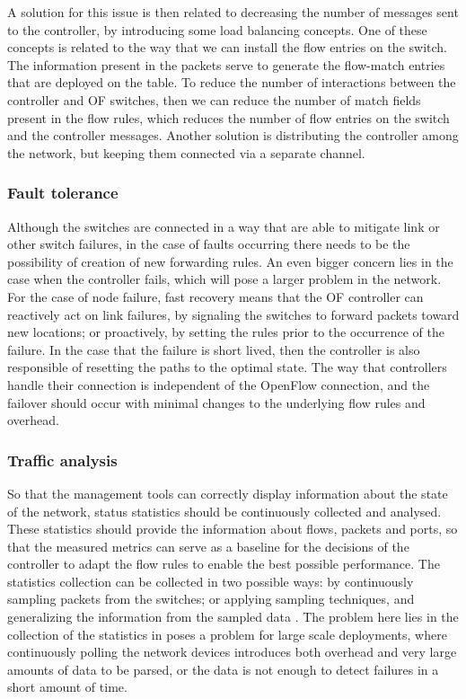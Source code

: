 \par A solution for this issue is then related to decreasing the number of messages sent to the controller, by introducing some load balancing concepts. One of
these concepts is related to the way that we can install the flow entries on the switch. The information present in the packets serve to generate the flow-match
entries that are deployed on the table. To reduce the number of interactions between the controller and OF switches, then we can reduce the number of match fields
present in the flow rules, which reduces the number of flow entries on the switch and the controller messages. Another solution is distributing the controller among
the network, but keeping them connected via a separate channel.

\subsubsection {Fault tolerance} \label{sec:fault_tolerance}

Although the switches are connected in a way that are able to mitigate link or other switch failures, in the case of faults occurring there needs to be the
possibility of creation of new forwarding rules. An even bigger concern lies in the case when the controller fails, which will pose a larger problem in the network. 
For the case of node failure, fast recovery means that the OF controller can reactively act on link failures, by signaling the switches to forward packets toward 
new locations; or proactively, by setting the rules prior to the occurrence of the failure. In the case that the failure is short lived, then the controller is also 
responsible of resetting the paths to the optimal state. The way that controllers handle their connection is independent of the OpenFlow connection, and the
failover should occur with minimal changes to the underlying flow rules and overhead.

\subsubsection {Traffic analysis}

So that the management tools can correctly display information about the state of the network, status statistics should be continuously collected and analysed. These
statistics should provide the information about flows, packets and ports, so that the measured metrics can serve as a baseline for the decisions of the controller to
adapt the flow rules to enable the best possible performance. The statistics collection can be collected in two possible ways: by continuously sampling
packets from the switches; or applying sampling techniques, and generalizing the information from the sampled data \cite{curtis_mahout:_2011}. The problem here lies
in the collection of the statistics in poses a problem for large scale deployments, where continuously polling the network devices introduces both overhead and very 
large amounts of data to be parsed, or the data is not enough to detect failures in a short amount of time. 

